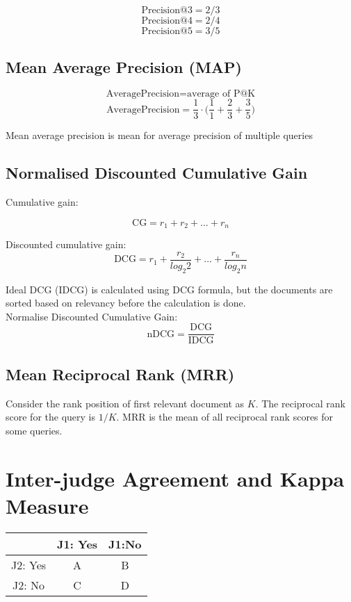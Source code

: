 \begin{multicols*}{2}
$$\text{Precision@3} = 2 / 3$$
$$\text{Precision@4} = 2 / 4$$
$$\text{Precision@5} = 3 / 5$$

\subsection{Mean Average Precision (MAP)}

$$\text{AveragePrecision} = \text{average of P@K}$$
$$\text{AveragePrecision} = \frac{1}{3} \cdot \Big(\frac{1}{1} + \frac{2}{3} + \frac{3}{5} \Big)$$

\noindent Mean average precision is mean for average precision of multiple queries

\subsection{Normalised Discounted Cumulative Gain}

\noindent Cumulative gain:

$$\text{CG}=r_1 + r_2 + \ldots + r_n$$

\noindent Discounted cumulative gain:
$$\text{DCG} = r_1 + \frac{r_2}{log_2 2} + \ldots + \frac{r_n}{log_2 n}$$

\noindent Ideal DCG (IDCG) is calculated using DCG formula, but the documents are sorted based on relevancy before the calculation is done. \\

\noindent Normalise Discounted Cumulative Gain:
$$\text{nDCG} = \frac{\text{DCG}}{\text{IDCG}}$$

\subsection{Mean Reciprocal Rank (MRR)}

\noindent Consider the rank position of first relevant document as $K$. The reciprocal rank score for the query is $1 / K$. MRR is the mean of all reciprocal rank scores for some queries. 

\section{Inter-judge Agreement and Kappa Measure}

\begin{center}
\begin{tabular}{ |c|c c| } 
    \hline
     & J1: Yes & J1:No \\
    \hline 
    J2: Yes & A & B \\
    J2: No & C & D \\
    \hline
\end{tabular}
\end{center}


\end{multicols*}
